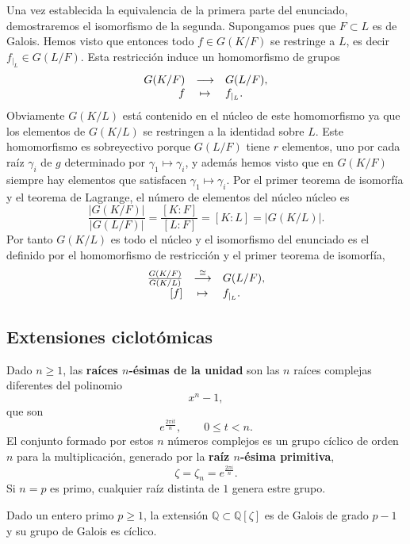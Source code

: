 Una vez establecida la equivalencia de la primera parte del enunciado,
demostraremos el isomorfismo de la segunda. Supongamos pues que
\(F\subset L\) es de Galois. Hemos visto que entonces todo
\(f\in G(K/F)\) se restringe a \(L\), es decir
\(f_{|_{L}}\in G(L/F)\). Esta restricción induce un homomorfismo de
grupos \[
\begin{array}{rcl}
G(K/F)&\longrightarrow&G(L/F),\cr
f&\mapsto&f_{|_{L}}.
\end{array}
\] Obviamente \(G(K/L)\) está contenido en el núcleo de este
homomorfismo ya que los elementos de \(G(K/L)\) se restringen a la
identidad sobre \(L\). Este homomorfismo es sobreyectivo porque
\(G(L/F)\) tiene \(r\) elementos, uno por cada raíz \(\gamma_i\) de
\(g\) determinado por \(\gamma_1\mapsto\gamma_i\), y además hemos
visto que en \(G(K/F)\) siempre hay elementos que satisfacen
\(\gamma_1\mapsto\gamma_i\). Por el primer teorema de isomorfía y el
teorema de Lagrange, el número de elementos del núcleo núcleo es \[
\frac{|G(K/F)|}{|G(L/F)|}=\frac{[K:F]}{[L:F]}=[K:L]=|G(K/L)|.
\] Por tanto \(G(K/L)\) es todo el núcleo y el isomorfismo del enunciado
es el definido por el homomorfismo de restricción y el primer teorema de
isomorfía, \[
\begin{array}{rcl}
\frac{G(K/F)}{G(K/L)}&\stackrel{\cong}\longrightarrow&G(L/F),\cr
[f]&\mapsto&f_{|_{L}}.
\end{array}
\] 

\hypertarget{extensiones-ciclotuxf3micas}{%
\subsection{Extensiones
ciclotómicas}\label{extensiones-ciclotuxf3micas}}

Dado \(n\geq 1\), las \textbf{raíces \(n\)-ésimas de la unidad} son las
\(n\) raíces complejas diferentes del polinomio \[x^n-1,\] que son
\[e^{\frac{2\pi i t}{n}}, \qquad 0\leq t{<}n.\] El conjunto formado por
estos \(n\) números complejos es un grupo cíclico de orden \(n\) para la
multiplicación, generado por la \textbf{raíz \(n\)-ésima primitiva},
\[\zeta=\zeta_n=e^{\frac{2\pi i}{n}}.\] Si \(n=p\) es primo, cualquier
raíz distinta de \(1\) genera estre grupo.


Dado un entero primo \(p\geq 1\), la extensión
\(\mathbb Q\subset\mathbb Q[\zeta]\) es de Galois de grado \(p-1\) y su
grupo de Galois es cíclico. 


